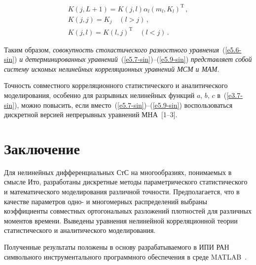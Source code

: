 \begin{multicols}{2}
\vspace*{-12pt}

\noindent
\begin{multline}
K(j, L+1) = K(j,l) \alpha_l (m_l, K_l)^{\mathrm{T}}\,,\\
K(j,j) = K_j\quad (l>j)\,,\\ 
K(j,l) = K(l,j)^{\mathrm{T}} \quad (l<j)\,.
\label{e5.9-sin}
\end{multline}


Таким образом, {\it совокупность стохастического разностного уравнения}~(\ref{e5.6-sin}) 
\textit{и детерминированных уравнений}~(\ref{e5.7-sin})--(\ref{e5.9-sin}) 
\textit{представляет собой систему искомых нелинейных корреляционных уравнений МСМ и МАМ}.

Точность совместного корреляционного статистического и аналитического моделирования, особенно 
для разрывных нелинейных функций $a$, $b$, $c$ в~(\ref{e3.7-sin}), можно повысить, если вместо~(\ref{e5.7-sin})--(\ref{e5.9-sin}) 
воспользоваться дискретной версией непрерывных уравнений МНА~[1--3].

\section{Заключение}


Для нелинейных дифференциальных СтС на многообразиях, понимаемых в смысле Ито, 
разработаны дискретные методы параметрического статистического и математического моделирования 
различной точности. Предполагается, что в качестве параметров одно- и многомерных распределений
выбраны коэффициенты совместных ортогональных разложений плотностей для различных моментов времени.
Выведены уравнения нелинейной корреляционной теории статистического и аналитического моделирования.

Полученные результаты положены в основу разрабатываемого в ИПИ РАН символьного инструментального 
программного обеспечения в среде MATLAB~\cite{17-sin}.

\end{multicols}





